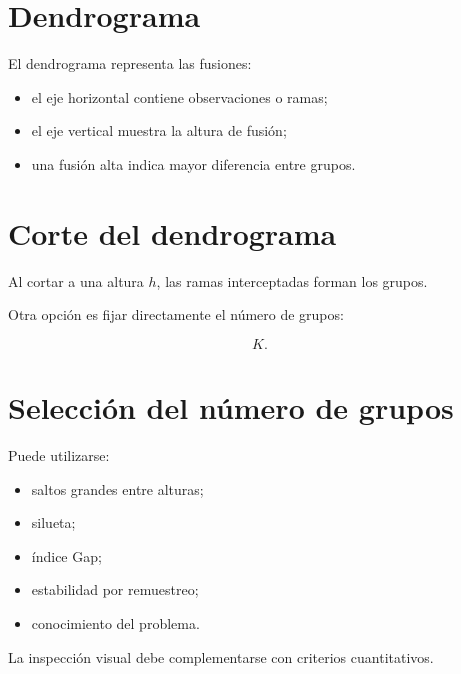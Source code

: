 \documentclass[
  spanish,
  10.5pt,
  letterpaper,
  DIV=11,
  numbers=noendperiod,
  oneside,
  open=any]{scrreprt}
\providecommand{\tightlist}{%
  \setlength{\itemsep}{0pt}\setlength{\parskip}{0pt}}
\theoremstyle{definition}
\theoremstyle{definition}
\theoremstyle{plain}
\theoremstyle{remark}
\begin{document}
\section*{Dendrograma}\label{dendrograma}


El dendrograma representa las fusiones:

\begin{itemize}
\tightlist
\item
  el eje horizontal contiene observaciones o ramas;
\item
  el eje vertical muestra la altura de fusión;
\item
  una fusión alta indica mayor diferencia entre grupos.
\end{itemize}

\section*{Corte del dendrograma}\label{corte-del-dendrograma}


Al cortar a una altura \(h\), las ramas interceptadas forman los grupos.

Otra opción es fijar directamente el número de grupos:

\[
K.
\]

\section*{Selección del número de
grupos}\label{selecciuxf3n-del-nuxfamero-de-grupos}


Puede utilizarse:

\begin{itemize}
\tightlist
\item
  saltos grandes entre alturas;
\item
  silueta;
\item
  índice Gap;
\item
  estabilidad por remuestreo;
\item
  conocimiento del problema.
\end{itemize}

La inspección visual debe complementarse con criterios cuantitativos.
\end{document}
